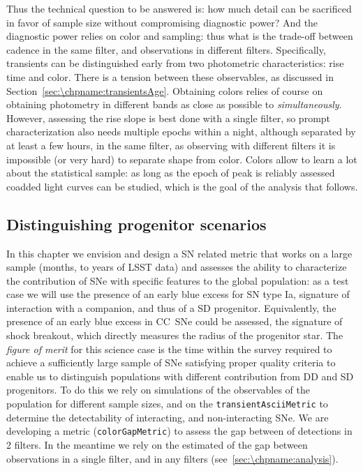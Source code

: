 Thus the technical question to be answered is: how much detail can be
sacrificed in favor of sample size without compromising diagnostic
power? And the diagnostic power relies on color and sampling: thus
what is the trade-off between cadence in the same filter, and
observations in different filters. Specifically, transients can be
distinguished early from two photometric characteristics: rise time
and color. There is a tension between these observables, as discussed
in Section~\ref{sec:\chpname:transientsAge}. Obtaining colors relies
of course on obtaining photometry in different bands as close as
possible to \emph{simultaneously}. However, assessing the rise slope
is best done with a single filter, so prompt characterization also
needs multiple epochs within a night, although separated by at least a
few hours, in the same filter, as observing with different
filters it is impossible (or very hard) to separate shape from
color. Colors allow to learn a lot about the
statistical sample: as long as the epoch of peak is reliably assessed
coadded light curves can be studied, which is the goal of the analysis
that follows.

\subsection{Distinguishing progenitor scenarios}

In this chapter we envision and design a SN related metric that works
on a large sample (months, to years of LSST data) and assesses the
ability to characterize the contribution of SNe with specific features
to the global population: as a test case we will use the presence of
an early blue excess for SN type Ia, signature of interaction with a
companion, and thus of a SD progenitor. Equivalently, the presence of
an early blue excess in CC~SNe could be assessed, the signature of shock
breakout, which directly measures the radius of the progenitor
star. The \emph{figure of merit} for this science case is the time
within the survey required to achieve a sufficiently large sample of
SNe satisfying proper quality criteria to enable us to distinguish
populations with different contribution from DD and SD progenitors.
To do this we rely on simulations of the observables of the population
for different sample sizes, and on the \texttt{transientAsciiMetric}
to determine the detectability of interacting, and non-interacting
SNe. We are developing a metric (\texttt{colorGapMetric}) to assess
the gap between of detections in 2 filters. In the meantime we rely on
the estimated of the gap between observations in a single filter, and
in any filters (see~\autoref{sec:\chpname:analysis}).

